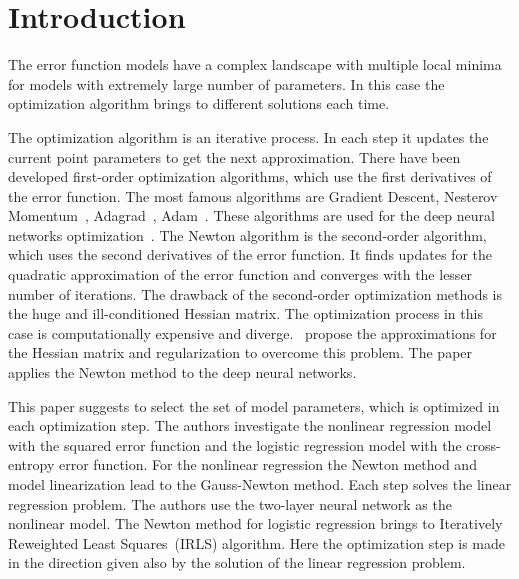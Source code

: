 \documentclass[
11pt,%
tightenlines,%
twoside,%
onecolumn,%
nofloats,%
nobibnotes,%
nofootinbib,%
superscriptaddress,%
noshowpacs,%
centertags]%
{revtex4}
\begin{document}


\maketitle


\section{Introduction}
The error function models have a complex landscape with multiple local minima for models with extremely large number of parameters. 
In this case the optimization algorithm brings to different solutions each time.

The optimization algorithm is an iterative process. 
In each step it updates the current point parameters to get the next approximation.
There have been developed first-order optimization algorithms, which use the first derivatives of the error function. 
The most famous algorithms are Gradient Descent, Nesterov Momentum~\cite{nesterov1983momentum}, Adagrad~\cite{duchi2011adagrad}, Adam~\cite{kingma2014adam}. 
These algorithms are used for the deep neural networks optimization~\cite{goodfellow2016deeplearningbook}. 
The Newton algorithm is the second-order algorithm, which uses the second derivatives of the error function. 
It finds updates for the quadratic approximation of the error function and converges with the lesser number of iterations.
The drawback of the second-order optimization methods is the huge and ill-conditioned Hessian matrix. 
The optimization process in this case is computationally expensive and diverge. 
\cite{avriel2003nonlinear,blaschke1997convergence}~propose the approximations for the Hessian matrix and regularization to overcome this problem.
The paper~\cite{botev2017newtondeeplearning} applies the Newton method to the deep neural networks.

This paper suggests to select the set of model parameters, which is optimized in each optimization step.
The authors investigate the nonlinear regression model with the squared error function and the logistic regression model with the cross-entropy error function.
For the nonlinear regression the Newton method and model linearization lead to the Gauss-Newton method. 
Each step solves the linear regression problem. 
The authors use the two-layer neural network as the nonlinear model. 
The Newton method for logistic regression brings to Iteratively Reweighted Least Squares~(IRLS) algorithm. 
Here the optimization step is made in the direction given also by the solution of the linear regression problem.
\end{document}
